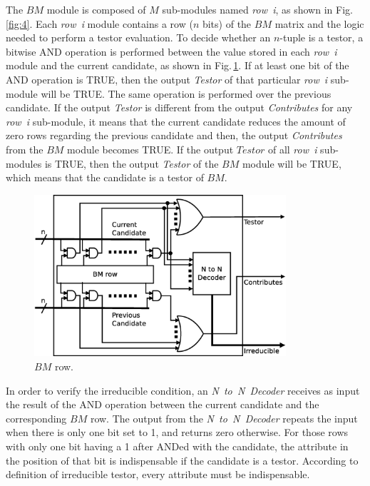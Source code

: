 \documentclass[authoryear,preprint,review,12pt]{elsarticle}
\begin{document}
The $BM$ module is composed of $M$ sub-modules named \textit{row~i}, as shown
in Fig.\,\ref{fig:4}. Each \textit{row~i} module contains a row ($n$ bits)
of the $BM$ matrix and the logic needed to perform a testor evaluation. To decide
whether an $n$-tuple is a testor, a bitwise AND operation is performed
between the value stored in each \textit{row~i} module and the current
candidate, as shown in Fig.\,\ref{fig:row}. If at least one bit of the AND operation is TRUE,
then the output \textit{Testor} of that particular \textit{row~i} sub-module
will be TRUE. The same operation is performed over the previous candidate.
If the output \textit{Testor} is different from
the output \textit{Contributes} for any \textit{row~i} sub-module,
it means that the current candidate reduces the amount of zero rows regarding the previous candidate and
then, the output \textit{Contributes} from the $BM$ module becomes TRUE.
If the output $Testor$ of all  \textit{row~i} sub-modules is
TRUE, then the output \textit{Testor} of the $BM$ module will be TRUE,
which means that the candidate is a testor of $BM$.


\begin{figure}[htb]
    \begin{center}
        \includegraphics[height=6cm]{BM_row.eps}
    \end{center}
\caption{$BM$ row.}
\label{fig:row}
\end{figure}

In order to verify the irreducible condition, an \textit{N~to~N~Decoder}
receives as input the result of the AND operation between the current candidate and the corresponding $BM$ row.
The output from the \textit{N~to~N~Decoder} repeats the input when there is only one bit set
to 1, and returns zero otherwise. For those rows with only one bit having a 1 after ANDed with the candidate,
the attribute in the position of that bit is indispensable if the candidate is a testor.
According to definition of irreducible testor, every attribute must be indispensable. %
\end{document}
